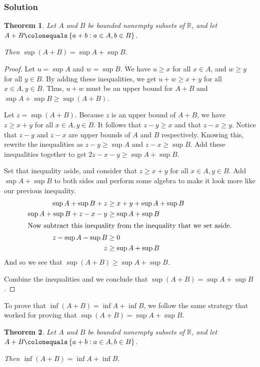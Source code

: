 \documentclass[12pt]{article}
\newtheorem*{thm}{Theorem}
\begin{document}
\subsubsection*{Solution}
\begin{thm}
Let $A$ and $B$ be bounded nonempty subsets of $\mathbb{R}$, and let $A + B \colonequals \left\{a + b : a \in A, b \in B\right\}$.

Then $\sup\left(A + B\right) = \sup A + \sup B$.
\end{thm}

\begin{proof}
Let $u = \sup A$ and $w = \sup B$. We have $u \geq x$ for all $x \in A$, and $w \geq y$ for all $y \in B$. By adding these inequalities, we get $u + w \geq x + y$ for all $x \in A, y \in B$. Thus, $u + w$ must be an upper bound for $A + B$ and $\sup A + \sup B \geq \sup \left(A + B\right)$.

Let $z = \sup\left(A + B\right)$. Because $z$ is an upper bound of $A + B$, we have $z \geq x + y$ for all $x \in A, y \in B$. It follows that $z - y \geq x$ and that $z - x \geq y$. Notice that $z - y$ and $z - x$ are upper bounds of $A$ and $B$ respectively. Knowing this, rewrite the inequalities as $z - y \geq \sup A$ and $z - x \geq \sup B$. Add these inequalities together to get $2z - x - y \geq \sup A + \sup B$.

Set that inequality aside, and consider that $z \geq x + y$ for all $x \in A, y \in B$. Add $\sup A + \sup B$ to both sides and perform some algebra to make it look more like our previous inequality.
\begin{align*}
\sup A + \sup B + z &\geq x + y + \sup A + \sup B\\
\sup A + \sup B + z - x - y &\geq \sup A + \sup B\\
\intertext{Now subtract this inequality from the inequality that we set aside.}
z - \sup A - \sup B &\geq 0\\
z &\geq \sup A +\sup B \\
\end{align*}
And so we see that $\sup\left(A + B\right) \geq \sup A + \sup B$.

Combine the inequalities and we conclude that $\sup\left(A + B\right) = \sup A + \sup B$.
\end{proof}

To prove that $\inf\left(A + B\right) = \inf A + \inf B$, we follow the same strategy that worked for proving that $\sup\left(A + B\right) = \sup A + \sup B$.

\begin{thm}
Let $A$ and $B$ be bounded nonempty subsets of $\mathbb{R}$, and let $A + B \colonequals \left\{a + b : a \in A, b \in B\right\}$.

Then $\inf\left(A + B\right) = \inf A + \inf B$.
\end{thm}
\end{document}
